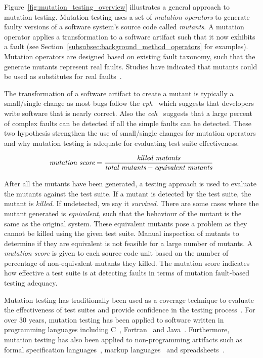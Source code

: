 Figure~\ref{fig:mutation_testing_overview} illustrates a general approach to mutation testing. Mutation testing uses a set of \emph{mutation operators} to generate faulty versions of a software system's source code called \emph{mutants}. A mutation operator applies a transformation to a software artifact such that it now exhibits a fault (see Section~\ref{subsubsec:background_method_operators} for examples). Mutation operators are designed based on existing fault taxonomy, such that the generate mutants represent real faults. Studies have indicated that mutants could be used as substitutes for real faults~\cite{ABLN06, ABL05, NK11}.

The transformation of a software artifact to create a mutant is typically a small/single change as most bugs follow the \emph{\gls{cph}}~\cite{ABD+79} which suggests that developers write software that is nearly correct. Also the \emph{\gls{ceh}}~\cite{Off92} suggests that a large percent of complex faults can be detected if all the simple faults can be detected. These two hypothesis strengthen the use of small/single changes for mutation operators and why mutation testing is adequate for evaluating test suite effectiveness.

\begin{equation}
  \emph{$\text{mutation score} = \frac{\text{killed mutants}}{\text{total mutants} - \text{equivalent mutants}}$}
  \label{equ:mutation_score}
\end{equation}

After all the mutants have been generated, a testing approach is used to evaluate the mutants against the test suite. If a mutant is detected by the test suite, the mutant is \emph{killed}. If undetected, we say it \emph{survived}. There are some cases where the mutant generated is \emph{equivalent}, such that the behaviour of the mutant is the same as the original system. These equivalent mutants pose a problem as they cannot be killed using the given test suite. Manual inspection of mutants to determine if they are equivalent is not feasible for a large number of mutants. A \emph{mutation score} is given to each source code unit based on the number of percentage of non-equivalent mutants they killed. The mutation score indicates how effective a test suite is at detecting faults in terms of mutation fault-based testing adequacy.

Mutation testing has traditionally been used as a coverage technique to evaluate the effectiveness of test suites and provide confidence in the testing process~\cite{JH10}. For over 30 years, mutation testing has been applied to software written in programming languages including C~\cite{DM96, JH08}, Fortran~\cite{KO91} and Java~\cite{MKO02, BCD06}. Furthermore, mutation testing has also been applied to non-programming artifacts such as formal specification languages~\cite{ABM98}, markup languages~\cite{PO10} and spreadsheets~\cite{AE09}.


